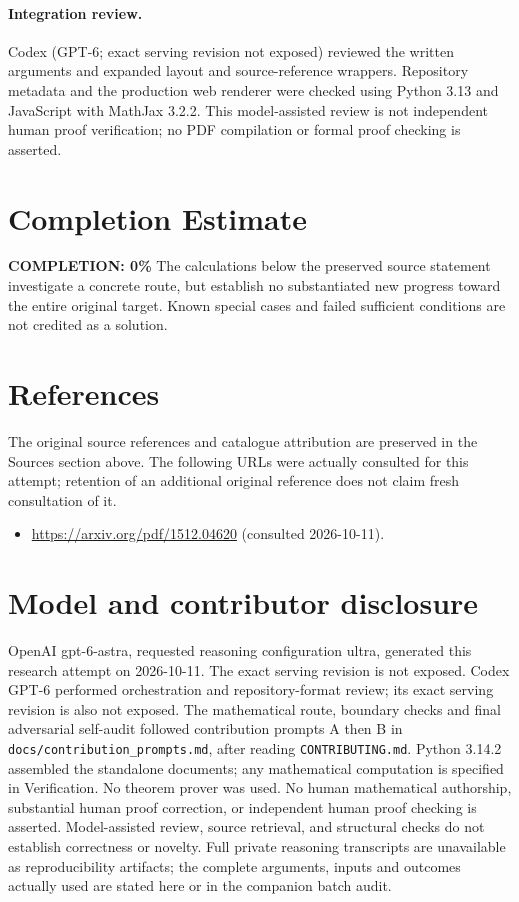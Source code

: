 \documentclass[11pt]{article}
\begin{document}
\paragraph{Integration review.} Codex (GPT-6; exact serving revision not exposed) reviewed the written arguments and expanded layout and source-reference wrappers. Repository metadata and the production web renderer were checked using Python 3.13 and JavaScript with MathJax 3.2.2. This model-assisted review is not independent human proof verification; no PDF compilation or formal proof checking is asserted.

\section{Completion Estimate}
\noindent\textbf{COMPLETION: 0\%}
The calculations below the preserved source statement investigate a concrete route,
but establish no substantiated new progress toward the entire original target.
Known special cases and failed sufficient conditions are not credited as a solution.
\section{References}
The original source references and catalogue attribution are preserved in the
Sources section above. The following URLs were actually consulted for this attempt;
retention of an additional original reference does not claim fresh consultation of it.
\begin{itemize}
\item \url{https://arxiv.org/pdf/1512.04620} (consulted 2026-10-11). 
\end{itemize}
\section{Model and contributor disclosure}
OpenAI gpt-6-astra, requested reasoning configuration ultra, generated this research
attempt on 2026-10-11. The exact serving revision is not exposed. Codex GPT-6
performed orchestration and repository-format review; its exact serving revision
is also not exposed. The mathematical route, boundary checks and final adversarial
self-audit followed contribution prompts A then B in
\texttt{docs/contribution\_prompts.md}, after reading \texttt{CONTRIBUTING.md}.
Python 3.14.2 assembled the standalone documents; any mathematical computation is
specified in Verification. No theorem prover was used. No human mathematical
authorship, substantial human proof correction, or independent human proof checking
is asserted. Model-assisted review, source retrieval, and structural checks do not
establish correctness or novelty. Full private reasoning transcripts are unavailable
as reproducibility artifacts; the complete arguments, inputs and outcomes actually
used are stated here or in the companion batch audit.
\end{document}
